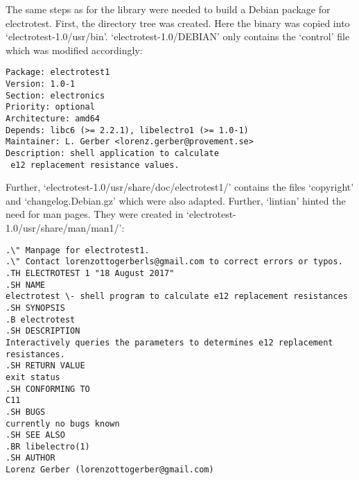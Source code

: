 \documentclass[a4paper,11pt,twoside]{article}
\begin{document}
The same steps as for the library were needed to build a Debian package for
electrotest. First, the directory tree was created. Here the binary was copied
into `electrotest-1.0/usr/bin'. `electrotest-1.0/DEBIAN' only contains the `control'
file which was modified accordingly:
\begin{verbatim}
Package: electrotest1
Version: 1.0-1
Section: electronics
Priority: optional
Architecture: amd64
Depends: libc6 (>= 2.2.1), libelectro1 (>= 1.0-1)
Maintainer: L. Gerber <lorenz.gerber@provement.se>
Description: shell application to calculate
 e12 replacement resistance values.
\end{verbatim}
Further, `electrotest-1.0/usr/share/doc/electrotest1/' contains the files
`copyright' and `changelog.Debian.gz' which were also adapted. Further, `lintian'
hinted the need for man pages. They were created in `electrotest-1.0/usr/share/man/man1/':
\begin{verbatim}
.\" Manpage for electrotest1.
.\" Contact lorenzottogerberls@gmail.com to correct errors or typos.
.TH ELECTROTEST 1 "18 August 2017"
.SH NAME
electrotest \- shell program to calculate e12 replacement resistances
.SH SYNOPSIS
.B electrotest
.SH DESCRIPTION
Interactively queries the parameters to determines e12 replacement resistances.
.SH RETURN VALUE
exit status
.SH CONFORMING TO
C11
.SH BUGS
currently no bugs known
.SH SEE ALSO
.BR libelectro(1)
.SH AUTHOR
Lorenz Gerber (lorenzottogerber@gmail.com)
\end{verbatim}






\end{document}
